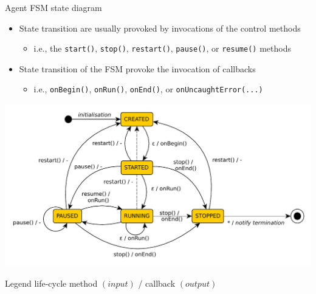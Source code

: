 \documentclass[presentation]{beamer}\mode<presentation>{\usetheme{AMSCesenaPurpleAndGold}}
\begin{document}
\begin{frame}[allowframebreaks]{Agent FSM state diagram}
\begin{itemize}
        \framebreak

        \item State transition are usually provoked by invocations of the \alert{control methods}
        \begin{itemize}
        	\item i.e., the \texttt{start()}, \texttt{stop()}, \texttt{restart()}, \texttt{pause()}, or \texttt{resume()} methods
        \end{itemize}



        \bigskip

        \item State transition of the FSM provoke the invocation of callbacks
        \begin{itemize}
        	\item i.e., \texttt{onBegin()}, \texttt{onRun()}, \texttt{onEnd()}, or \texttt{onUncaughtError(...)}
        \end{itemize}
    \end{itemize}

    \framebreak

    \begin{center}
        \includegraphics[width=.8\linewidth]{img/fsm.pdf}
    \end{center}

    \begin{block}{Legend}\centering
        life-cycle method $(input)$ / callback $(output)$
    \end{block}

\end{frame}
\end{document}

